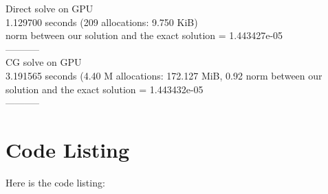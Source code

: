 \documentclass[11pt]{article}
\begin{document}
Direct solve on GPU\\
  1.129700 seconds (209 allocations: 9.750 KiB)\\
norm between our solution and the exact solution =  1.443427e-05 
\\-----------\\

CG solve on GPU\\
  3.191565 seconds (4.40 M allocations: 172.127 MiB, 0.92%
norm between our solution and the exact solution =  1.443432e-05 
\\-----------\\

	\section{Code Listing}
	Here is the code listing:
\end{document}
